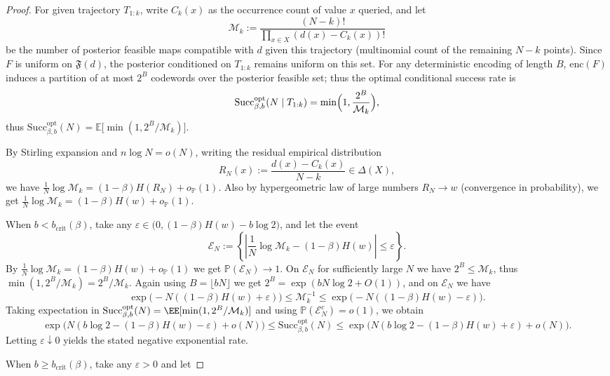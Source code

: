 \begin{proof}[Proof]
For given trajectory \(T_{1:k}\), write \(C_k(x)\) as the occurrence count of value \(x\) queried, and let
\[
\mathcal{M}_k
:=
\frac{(N-k)!}{\prod_{x\in X}(d(x)-C_k(x))!}
\]
be the number of posterior feasible maps compatible with \(d\) given this trajectory (multinomial count of the remaining \(N-k\) points).
Since \(F\) is uniform on \(\mathfrak{F}(d)\), the posterior conditioned on \(T_{1:k}\) remains uniform on this set.
For any deterministic encoding of length \(B\), \(\mathrm{enc}(F)\) induces a partition of at most \(2^B\) codewords over the posterior feasible set; thus the optimal conditional success rate is
\[
\mathrm{Succ}^{\mathrm{opt}}_{\beta,b}(N\mid T_{1:k})
=\min\Bigl(1,\frac{2^B}{\mathcal{M}_k}\Bigr),
\]
thus
\(
\mathrm{Succ}^{\mathrm{opt}}_{\beta,b}(N)=\mathbb{E}\bigl[\min(1,2^B/\mathcal{M}_k)\bigr]
\).
\par
By Stirling expansion and \(n\log N=o(N)\), writing the residual empirical distribution
\[
R_N(x):=\frac{d(x)-C_k(x)}{N-k}\in\Delta(X),
\]
we have
\(
\frac{1}{N}\log\mathcal{M}_k=(1-\beta)H(R_N)+o_{\mathbb{P}}(1)
\).
Also by hypergeometric law of large numbers \(R_N\to w\) (convergence in probability), we get
\(
\frac{1}{N}\log\mathcal{M}_k=(1-\beta)H(w)+o_{\mathbb{P}}(1)
\).
\par
When \(b<b_{\mathrm{crit}}(\beta)\), take any \(\varepsilon\in\bigl(0,(1-\beta)H(w)-b\log 2\bigr)\), and let the event
\[
\mathcal{E}_N:=\left\{\left|\frac{1}{N}\log\mathcal{M}_k-(1-\beta)H(w)\right|\le \varepsilon\right\}.
\]
By \(\frac{1}{N}\log\mathcal{M}_k=(1-\beta)H(w)+o_{\mathbb{P}}(1)\) we get \(\mathbb{P}(\mathcal{E}_N)\to 1\).
On \(\mathcal{E}_N\) for sufficiently large \(N\) we have \(2^B\le \mathcal{M}_k\), thus \(\min(1,2^B/\mathcal{M}_k)=2^B/\mathcal{M}_k\).
Again using \(B=\lfloor bN\rfloor\) we get \(2^B=\exp(bN\log 2+O(1))\), and on \(\mathcal{E}_N\) we have
\[
\exp\!\bigl(-N((1-\beta)H(w)+\varepsilon)\bigr)
\le
\mathcal{M}_k^{-1}
\le
\exp\!\bigl(-N((1-\beta)H(w)-\varepsilon)\bigr).
\]
Taking expectation in \(\mathrm{Succ}^{\mathrm{opt}}_{\beta,b}(N)=\EE[\min(1,2^B/\mathcal{M}_k)]\) and using \(\mathbb{P}(\mathcal{E}_N^c)=o(1)\), we obtain
\[
\exp\!\bigl(N(b\log 2-(1-\beta)H(w)-\varepsilon)+o(N)\bigr)
\le
\mathrm{Succ}^{\mathrm{opt}}_{\beta,b}(N)
\le
\exp\!\bigl(N(b\log 2-(1-\beta)H(w)+\varepsilon)+o(N)\bigr).
\]
Letting \(\varepsilon\downarrow 0\) yields the stated negative exponential rate.
\par
When \(b\ge b_{\mathrm{crit}}(\beta)\), take any \(\varepsilon>0\) and let

\end{proof}
